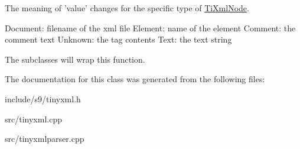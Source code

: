 \-The meaning of 'value' changes for the specific type of \hyperlink{classTiXmlNode}{\-Ti\-Xml\-Node}. \begin{DoxyVerb}
		Document:	filename of the xml file
		Element:	name of the element
		Comment:	the comment text
		Unknown:	the tag contents
		Text:		the text string
		\end{DoxyVerb}


\-The subclasses will wrap this function. 

\-The documentation for this class was generated from the following files\-:\begin{DoxyCompactItemize}
\item 
include/s9/tinyxml.\-h\item 
src/tinyxml.\-cpp\item 
src/tinyxmlparser.\-cpp\end{DoxyCompactItemize}
